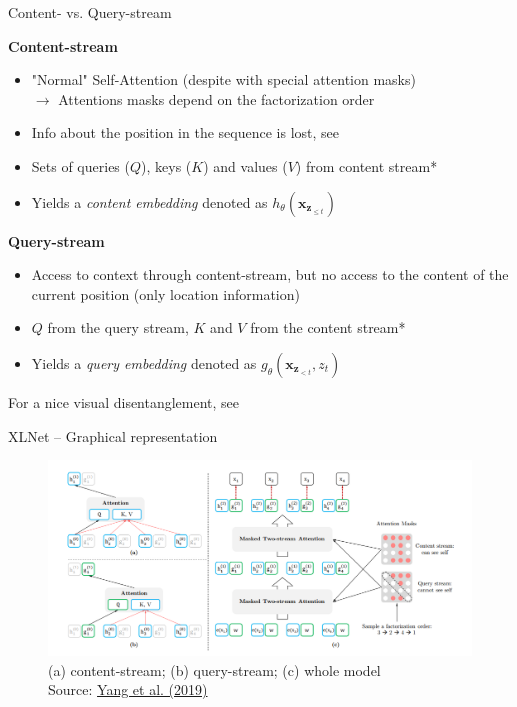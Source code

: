 \documentclass[]{beamer}
\begin{document}
\begin{frame}{Content- vs. Query-stream}

	\textbf{Content-stream}
	
	\begin{itemize}
		\item "Normal" Self-Attention (despite with special attention masks)\\
					$\rightarrow$ Attentions masks depend on the factorization order
		\item Info about the position in the sequence is lost, see \href{https://arxiv.org/pdf/1906.08237.pdf}{}
		\item Sets of queries ($Q$), keys ($K$) and values ($V$) from content stream*
		\item Yields a \textit{content embedding} denoted as $h_{\theta}(\mathbf{x}_{\mathbf{z}_{\leq t}})$
	\end{itemize}

	\vspace{.3cm}
	
	\textbf{Query-stream}
	
	\begin{itemize}
		\item Access to context through content-stream, but no access to the content of the current position (only location information)
		\item $Q$ from the query stream, $K$ and $V$ from the content stream*
		\item Yields a \textit{query embedding} denoted as $g_{\theta}(\mathbf{x}_{\mathbf{z}_{< t}}, z_t)$
	\end{itemize}

	\vspace{.3cm}
	
	{\footnotesize *For a nice visual disentanglement, see \href{https://arxiv.org/pdf/1906.08237.pdf}{}}
\end{frame}



\begin{frame}{XLNet -- Graphical representation}
	\begin{figure}
		\centering
		\includegraphics[width = 12cm]{figure/xlnet}\\ 
		{\tiny (a) content-stream; (b) query-stream; (c) whole model\\\footnotesize Source: \href{https://papers.nips.cc/paper/8812-xlnet-generalized-autoregressive-pretraining-for-language-understanding.pdf}{Yang et al. (2019)}}
	\end{figure}
\end{frame}
\end{document}
